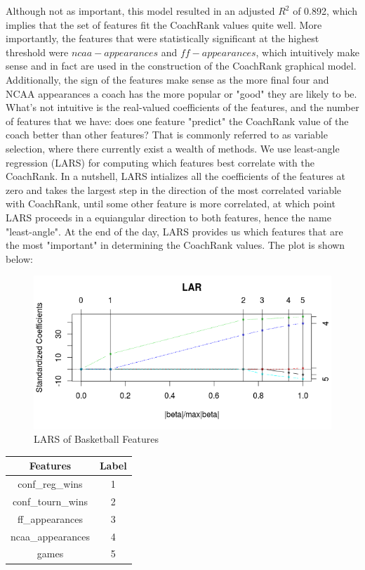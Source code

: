 \documentclass[11pt,notitlepage]{article}
\begin{document}
\vspace{2 mm}

\noindent Although not as important, this model resulted in an adjusted $R^2$ of 0.892, which implies that the set of features fit the CoachRank values quite well. More importantly, the features that were statistically significant at the highest threshold were $ncaa-appearances$ and $ff-appearances$, which intuitively make sense and in fact are used in the construction of the CoachRank graphical model. Additionally, the sign of the features make sense as the more final four and NCAA appearances a coach has the more popular or "good" they are likely to be. What's not intuitive is the real-valued coefficients of the features, and the number of features that we have: does one feature "predict" the CoachRank value of the coach better than other features? That is commonly referred to as variable selection, where there currently exist a wealth of methods. We use least-angle regression (LARS) for computing which features best correlate with the CoachRank. In a nutshell, LARS intializes all the coefficients of the features at zero and takes the largest step in the direction of the most correlated variable with CoachRank, until some other feature is more correlated, at which point LARS proceeds in a equiangular direction to both features, hence the name "least-angle". At the end of the day, LARS provides us which features that are the most "important" in determining the CoachRank values. The plot is shown below:

\begin{figure}[H]
      \caption{LARS of Basketball Features}
      \centering
      \includegraphics[width=1.0\textwidth]{fixedplot.png}
\end{figure}

\begin{center}
\begin{tabular}{ | c | c |}
\hline
Features            & Label \\\hline
conf\_reg\_wins      & 1      \\\hline
conf\_tourn\_wins     & 2     \\\hline
ff\_appearances      &  3    \\\hline
ncaa\_appearances    & 4      \\\hline
games               & 5      \\
\hline
\end{tabular}
\end{center}
\end{document}
